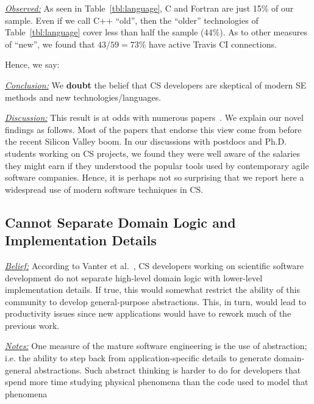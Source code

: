 \documentclass[sigconf,review,anonymous]{acmart}
\newenvironment{RQ}{\vspace{1mm}\begin{tcolorbox}[enhanced,width=3.4in,size=fbox,colback=red!5!white,drop shadow southeast,sharp corners]}{\end{tcolorbox}}
\begin{document}
\noindent\textit{\underline{Observed:}} 
As seen in Table~\ref{tbl:language}, C and Fortran are just 15\% of our sample.
Even if we call C++ ``old'', then the ``older'' technologies of Table~\ref{tbl:language}
cover less than half the sample (44\%).
 As to other measures of ``new'', we found that  $43/59=73\%$
have active
Travis CI connections.  

 

Hence, we say:

\begin{RQ} 
\textit{\underline{Conclusion:}} We \textbf{doubt} the belief that 
CS developers are skeptical of modern SE methods and new technologies/languages.
\end{RQ}

\noindent \textit{\underline{Discussion:}} This result is at odds
with numerous papers~\cite{basili08_hpc, carver07_environment, Prabhu11_cssurvey, kendall05_C, ragan14_pythoncs}. We explain our novel findings as follows. 
Most of the papers that endorse this view come from before the recent Silicon Valley boom. In our discussions with postdocs and Ph.D. students working on CS projects,
we found they were well aware of the salaries they might earn if they understood the popular tools used by contemporary agile software companies. 
Hence, it is perhaps not so surprising that we report here a widespread use of modern software techniques in CS.
 


\subsection{Cannot Separate Domain Logic and Implementation Details} 

\noindent \textit{\underline{Belief:}} 
According to Vanter et al.~\cite{faulk09_secs},
CS developers working on scientific software development do not separate high-level domain logic with
lower-level implementation details. If true, this would somewhat restrict the ability
of this community to develop general-purpose abstractions. This, in turn, would lead
to productivity issues since new applications would have to rework much of the previous
work. 


\noindent \textit{\underline{Notes:}} One measure of the mature software engineering is the
use of abstraction; i.e. the ability to step back from application-specific
details to generate domain-general abstractions. Such abstract thinking is harder to do for developers that spend more time studying physical phenomena than the code used to model that phenomena
\end{document}
